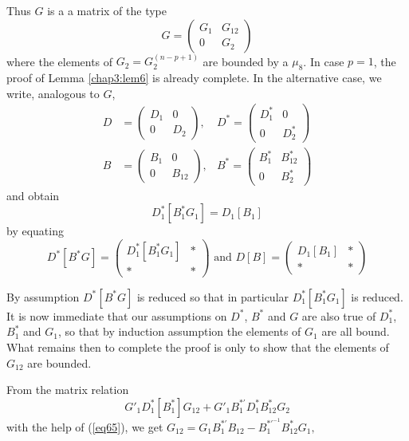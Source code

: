 Thus $G$ is a a matrix of  the type 
$$
G =  
\begin{pmatrix}
 G_1 & G_{1 2}\\
0 & G_2 
\end{pmatrix}
$$
where the elements of $G_2 = G^{ ( n- p + 1)}_2 $  are
bounded by a $ \mu_8 $. In case $ p = 1 $, the proof of
Lemma \ref{chap3:lem6}  is already complete. In the  alternative case,
we write, analogous to $G$, 
\begin{align*}
 D &= \begin{pmatrix} D_1 & 0 \\ 0 & D_2 \end{pmatrix}, &D^*
 = \begin{pmatrix} D^*_1 & 0 \\ 0 & D^*_2 \end{pmatrix} \\ 
 B &= \begin{pmatrix} B_1 & 0 \\ 0 & B_{1 2} \end{pmatrix}, &B^*
 = \begin{pmatrix} B^*_1 & B^*_{1 2} \\ 0 & B^*_2 \end{pmatrix}
\end{align*}
and obtain
\begin{equation*}
D^*_1 [ B^*_1 G_1 ]   = D_1 [ B_1 ] \tag{65}\label{eq65}  
\end{equation*}
by equating
$$ 
 D^* [ B^* G ] = \begin{pmatrix} D^*_1 [ B^*_1 G_1 ] & * \\ * &
   * \end{pmatrix}  \text{ and } D [ B ] = \begin{pmatrix} D_1 [ B_1 ]
   & * \\ * & * \end{pmatrix} 
$$

By assumption $D^* [ B^* G ] $  is reduced so that in particular  $
D^*_1 [ B^*_1 G_1 ] $ is reduced. It is now immediate that our
assumptions on $ D^*$, $B^* $ and $G$  are also true  of $ D^*_1$,
$B^*_1$ and $G_1 $, so that by induction assumption the elements of $G_1 $
are all bound. What remains then to complete the proof is only to show
that the elements of $G_{ 1 2} $ are bounded. 

From the matrix relation
$$
G'_1 D^*_1 [ B^*_1 ] G_{12} + 
G'_1 B^{\ast'}_1 D^\ast_1 B^\ast_{12} G_2
$$
with the help of (\ref{eq65}), we get  $G_{12} = G_1 B^{\ast'}_1 B_{12} -
B^{\ast'^{-1}}_1 B^\ast_{12} G_1,$ 

